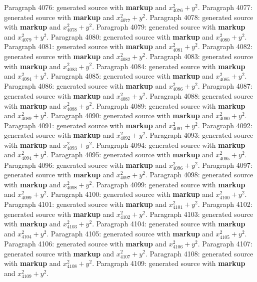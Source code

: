 \documentclass{article}
\begin{document}
Paragraph 4076: generated source with \textbf{markup} and $x_{4076}^2 + y^2$.
Paragraph 4077: generated source with \textbf{markup} and $x_{4077}^2 + y^2$.
Paragraph 4078: generated source with \textbf{markup} and $x_{4078}^2 + y^2$.
Paragraph 4079: generated source with \textbf{markup} and $x_{4079}^2 + y^2$.
Paragraph 4080: generated source with \textbf{markup} and $x_{4080}^2 + y^2$.
Paragraph 4081: generated source with \textbf{markup} and $x_{4081}^2 + y^2$.
Paragraph 4082: generated source with \textbf{markup} and $x_{4082}^2 + y^2$.
Paragraph 4083: generated source with \textbf{markup} and $x_{4083}^2 + y^2$.
Paragraph 4084: generated source with \textbf{markup} and $x_{4084}^2 + y^2$.
Paragraph 4085: generated source with \textbf{markup} and $x_{4085}^2 + y^2$.
Paragraph 4086: generated source with \textbf{markup} and $x_{4086}^2 + y^2$.
Paragraph 4087: generated source with \textbf{markup} and $x_{4087}^2 + y^2$.
Paragraph 4088: generated source with \textbf{markup} and $x_{4088}^2 + y^2$.
Paragraph 4089: generated source with \textbf{markup} and $x_{4089}^2 + y^2$.
Paragraph 4090: generated source with \textbf{markup} and $x_{4090}^2 + y^2$.
Paragraph 4091: generated source with \textbf{markup} and $x_{4091}^2 + y^2$.
Paragraph 4092: generated source with \textbf{markup} and $x_{4092}^2 + y^2$.
Paragraph 4093: generated source with \textbf{markup} and $x_{4093}^2 + y^2$.
Paragraph 4094: generated source with \textbf{markup} and $x_{4094}^2 + y^2$.
Paragraph 4095: generated source with \textbf{markup} and $x_{4095}^2 + y^2$.
Paragraph 4096: generated source with \textbf{markup} and $x_{4096}^2 + y^2$.
Paragraph 4097: generated source with \textbf{markup} and $x_{4097}^2 + y^2$.
Paragraph 4098: generated source with \textbf{markup} and $x_{4098}^2 + y^2$.
Paragraph 4099: generated source with \textbf{markup} and $x_{4099}^2 + y^2$.
Paragraph 4100: generated source with \textbf{markup} and $x_{4100}^2 + y^2$.
Paragraph 4101: generated source with \textbf{markup} and $x_{4101}^2 + y^2$.
Paragraph 4102: generated source with \textbf{markup} and $x_{4102}^2 + y^2$.
Paragraph 4103: generated source with \textbf{markup} and $x_{4103}^2 + y^2$.
Paragraph 4104: generated source with \textbf{markup} and $x_{4104}^2 + y^2$.
Paragraph 4105: generated source with \textbf{markup} and $x_{4105}^2 + y^2$.
Paragraph 4106: generated source with \textbf{markup} and $x_{4106}^2 + y^2$.
Paragraph 4107: generated source with \textbf{markup} and $x_{4107}^2 + y^2$.
Paragraph 4108: generated source with \textbf{markup} and $x_{4108}^2 + y^2$.
Paragraph 4109: generated source with \textbf{markup} and $x_{4109}^2 + y^2$.
\end{document}
